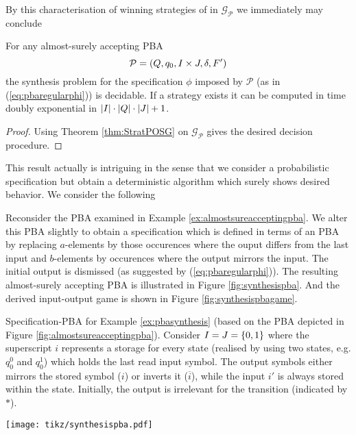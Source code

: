 By this characterisation of winning strategies of \eve{} in 
$\mathcal{G}_{\mathcal{P}}$ we immediately may conclude
\begin{theorem}
  For any almost-surely accepting \ac{PBA} 
  \begin{equation*}
    \mathcal{P} = \left(Q, q_{0}, I\times J, \delta, F'\right)
  \end{equation*}
  the synthesis problem for the specification $\phi$ imposed by $\mathcal{P}$
  (as in (\ref{eq:pbaregularphi})) is decidable. If a strategy exists it can
  be computed in time doubly exponential in
  $\left\vert{I}\right\vert\cdot \left\vert{Q}\right\vert\cdot \left\vert{J}\right\vert + 1$.
  \label{thm:pbastratpomdpsynthesis}
\end{theorem}
\begin{proof}
  Using Theorem \ref{thm:StratPOSG} on $\mathcal{G}_{\mathcal{P}}$ gives the
  desired decision procedure.
\end{proof}
This result actually is intriguing in the sense that we consider a 
probabilistic specification but obtain a deterministic algorithm which surely 
shows desired behavior. We consider the following
\begin{example}
  Reconsider the \ac{PBA} examined in Example \ref{ex:almostsureacceptingpba}.
  We alter this \ac{PBA} slightly to obtain a specification which is defined in
  terms of an \ac{PBA} by replacing $a$-elements by those occurences where the
  ouput differs from the last input and $b$-elements by occurences where the 
  output mirrors the input. The initial output is dismissed (as suggested by
  (\ref{eq:pbaregularphi})). The resulting almost-surely accepting \ac{PBA} is
  illustrated in Figure \ref{fig:synthesispba}. And the derived input-output 
  game is shown in Figure \ref{fig:synthesispbagame}.
  \label{ex:pbasynthesis}
\end{example}
\begin{drawing}
  \caption{
    Specification-PBA for Example \ref{ex:pbasynthesis} (based on the PBA 
    depicted in Figure \ref{fig:almostsureacceptingpba}). Consider 
    $I = J =\left\{0,1\right\}$ where the superscript $i$ represents a storage for every
    state (realised by using two states, e.g. $q_{0}^{0}$ and $q_{0}^{1}$) 
    which holds the last read input symbol. The output symbols either mirrors 
    the stored symbol ($i$) or inverts it ($\overline{i}$), while the input 
    $i'$ is always stored within the state. Initially, the output is irrelevant 
    for the transition (indicated by $*$).
  }
  \label{fig:synthesispba}
  \begin{center}
    \texttt{[image: tikz/synthesispba.pdf]}
  \end{center}
\end{drawing}

